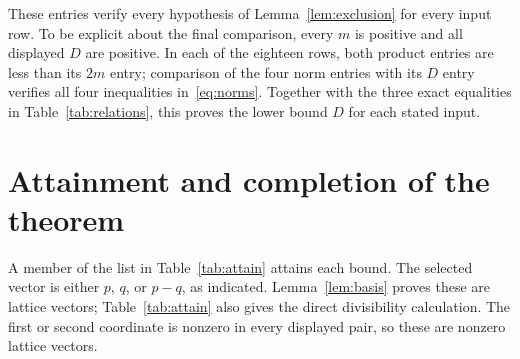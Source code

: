 \documentclass{article}
\begin{document}
These entries verify every hypothesis of Lemma~\ref{lem:exclusion} for every input row.
To be explicit about the final comparison, every \(m\) is positive and
all displayed \(D\) are positive. In each of the eighteen rows, both
product entries are less than its \(2m\) entry; comparison of the four
norm entries with its \(D\) entry verifies all four inequalities in~\eqref{eq:norms}.
Together with the three exact equalities in Table~\ref{tab:relations}, this
proves the lower bound \(D\) for each stated input.

\section{Attainment and completion of the theorem}\label{sec:attainment}

A member of the list in Table~\ref{tab:attain} attains each bound. The selected vector
is either \(p\), \(q\), or \(p-q\), as indicated. Lemma~\ref{lem:basis} proves these are
lattice vectors; Table~\ref{tab:attain} also gives the direct divisibility calculation.
The first or second coordinate is nonzero in every displayed pair, so
these are nonzero lattice vectors.
\end{document}
